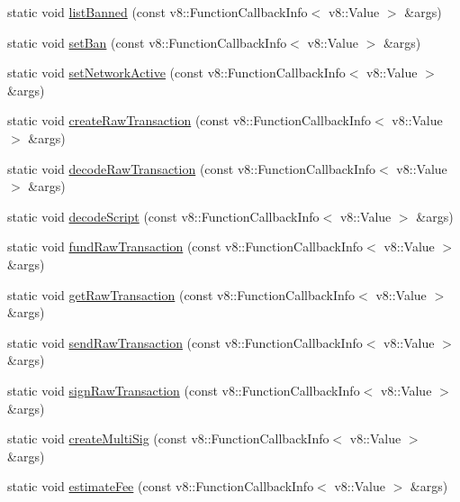 \begin{DoxyCompactItemize}
static void \mbox{\hyperlink{class_rad_j_a_v_1_1_blockchain_v1_a5b5d2f1868309249f32d1be453ad1c11}{list\+Banned}} (const v8\+::\+Function\+Callback\+Info$<$ v8\+::\+Value $>$ \&args)
\item 
static void \mbox{\hyperlink{class_rad_j_a_v_1_1_blockchain_v1_aa0e0f6e9baee9c0ead1b4e0c937de84d}{set\+Ban}} (const v8\+::\+Function\+Callback\+Info$<$ v8\+::\+Value $>$ \&args)
\item 
static void \mbox{\hyperlink{class_rad_j_a_v_1_1_blockchain_v1_ab2d43a86b815106394f6dbfce9b02de9}{set\+Network\+Active}} (const v8\+::\+Function\+Callback\+Info$<$ v8\+::\+Value $>$ \&args)
\item 
static void \mbox{\hyperlink{class_rad_j_a_v_1_1_blockchain_v1_ad98ae1efc60ea27e76a1ed0ba4f671cb}{create\+Raw\+Transaction}} (const v8\+::\+Function\+Callback\+Info$<$ v8\+::\+Value $>$ \&args)
\item 
static void \mbox{\hyperlink{class_rad_j_a_v_1_1_blockchain_v1_ac3a54801ca2be8230a1e53f62c4a832f}{decode\+Raw\+Transaction}} (const v8\+::\+Function\+Callback\+Info$<$ v8\+::\+Value $>$ \&args)
\item 
static void \mbox{\hyperlink{class_rad_j_a_v_1_1_blockchain_v1_aa4cfd6ed6fd748c4819a5b0eca15160e}{decode\+Script}} (const v8\+::\+Function\+Callback\+Info$<$ v8\+::\+Value $>$ \&args)
\item 
static void \mbox{\hyperlink{class_rad_j_a_v_1_1_blockchain_v1_ae01dab41695d199c5fc6711601166192}{fund\+Raw\+Transaction}} (const v8\+::\+Function\+Callback\+Info$<$ v8\+::\+Value $>$ \&args)
\item 
static void \mbox{\hyperlink{class_rad_j_a_v_1_1_blockchain_v1_a66edaebc87e3276412adfd495b0c0cf0}{get\+Raw\+Transaction}} (const v8\+::\+Function\+Callback\+Info$<$ v8\+::\+Value $>$ \&args)
\item 
static void \mbox{\hyperlink{class_rad_j_a_v_1_1_blockchain_v1_a3070f2ee3cce94e5fbe4713ac5140a41}{send\+Raw\+Transaction}} (const v8\+::\+Function\+Callback\+Info$<$ v8\+::\+Value $>$ \&args)
\item 
static void \mbox{\hyperlink{class_rad_j_a_v_1_1_blockchain_v1_ad2e1e6efc8bbfe353178bd28abfe02ca}{sign\+Raw\+Transaction}} (const v8\+::\+Function\+Callback\+Info$<$ v8\+::\+Value $>$ \&args)
\item 
static void \mbox{\hyperlink{class_rad_j_a_v_1_1_blockchain_v1_a7d8e9d5a2b0ff25988e196eb4cc7bb07}{create\+Multi\+Sig}} (const v8\+::\+Function\+Callback\+Info$<$ v8\+::\+Value $>$ \&args)
\item 
static void \mbox{\hyperlink{class_rad_j_a_v_1_1_blockchain_v1_a43ae6cfc18350260be94bcef4b04ccdc}{estimate\+Fee}} (const v8\+::\+Function\+Callback\+Info$<$ v8\+::\+Value $>$ \&args)

\end{DoxyCompactItemize}
